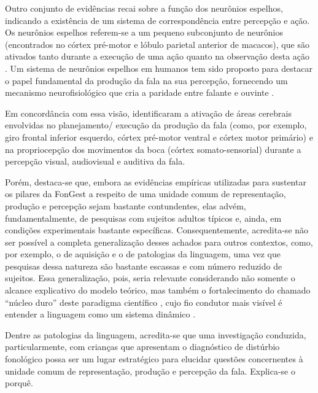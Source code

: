 \documentclass[output=paper,colorlinks,citecolor=brown,booklanguage=portuguese]{langscibook}
\begin{document}
Outro conjunto de evidências recai sobre a função dos neurônios espelhos, indicando a existência de um sistema de correspondência entre percepção e ação. Os neurônios espelhos referem-se a um pequeno subconjunto de neurônios (encontrados no córtex pré-motor e lóbulo parietal anterior de macacos), que são ativados tanto durante a execução de uma ação quanto na observação desta ação \citep{Rizzolatti2004}. Um sistema de neurônios espelhos em humanos tem sido proposto para destacar o papel fundamental da produção da fala na sua percepção, fornecendo um mecanismo neurofisiológico que cria a paridade entre falante e ouvinte \citep{Rizzolatti1998, Gentilucci2006}.

Em concordância com essa visão, \citet{Pulvermueller2006} identificaram a ativação de áreas cerebrais envolvidas no planejamento/ execução da produção da fala (como, por exemplo, giro frontal inferior esquerdo, córtex pré-motor ventral e córtex motor primário) e na propriocepção dos movimentos da boca (córtex somato-sensorial) durante a percepção visual, audiovisual e auditiva da fala.

Porém, destaca-se que, embora as evidências empíricas utilizadas para sustentar os pilares da FonGest a respeito de uma unidade comum de representação, produção e percepção sejam bastante contundentes, elas advém, fundamentalmente, de pesquisas com sujeitos adultos típicos e, ainda, em condições experimentais bastante específicas. Consequentemente, acredita-se não ser possível a completa generalização desses achados para outros contextos, como, por exemplo, o de aquisição e o de patologias da linguagem, uma vez que pesquisas dessa natureza são bastante escassas e com  número reduzido de sujeitos. Essa generalização, pois, seria relevante considerando não somente o alcance explicativo do modelo teórico, mas também o fortalecimento do chamado “núcleo duro” deste paradigma científico \citep{Lakatos1979}, cujo fio condutor mais visível é entender a linguagem como um sistema dinâmico \citep{Albano2020}.

Dentre as patologias da linguagem, acredita-se que uma investigação conduzida, particularmente, com crianças que apresentam o diagnóstico de distúrbio fonológico possa ser um lugar estratégico para elucidar questões concernentes à unidade comum de representação, produção e percepção da fala. Explica-se o porquê.
\end{document}
